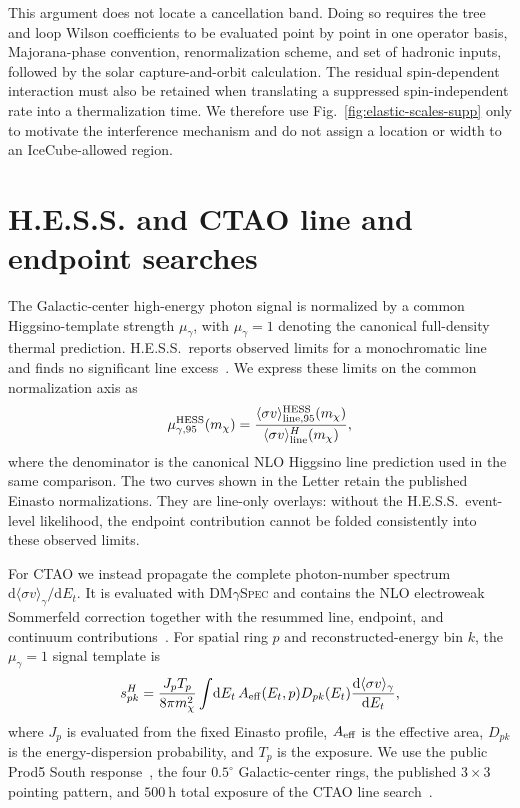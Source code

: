 \documentclass[%
  aps,
  prl,
  reprint,
  superscriptaddress,
  amsmath,
  amssymb,
  longbibliography
]{revtex4-2}
\begin{document}
{This argument does not locate a cancellation band.  Doing so requires the
tree and loop Wilson coefficients to be evaluated point by point in one
operator basis, Majorana-phase convention, renormalization scheme, and set
of hadronic inputs,
followed by the solar capture-and-orbit calculation.  The residual
spin-dependent interaction must also be retained when translating a
suppressed spin-independent rate into a thermalization time.  We therefore
use Fig.~\ref{fig:elastic-scales-supp} only to motivate the interference
mechanism and do not assign a location or width to an IceCube-allowed
region.


\section{H.E.S.S. and CTAO line and endpoint searches}
\label{sec:hess-ctao-supp}

The Galactic-center high-energy photon signal is normalized by a common
Higgsino-template strength \(\mu_\gamma\), with \(\mu_\gamma=1\) denoting
the canonical full-density thermal prediction.  H.E.S.S.~reports observed
limits for a monochromatic line and finds no significant line
excess~\cite{HESS:2026ila}.  We express these limits on the common
normalization axis as
\begin{equation}
 \mu_{\gamma,95}^{\rm HESS}(m_\chi)=
 \frac{\langle\sigma v\rangle_{\rm line,95}^{\rm HESS}(m_\chi)}
 {\langle\sigma v\rangle_{\rm line}^{H}(m_\chi)},
 \label{eq:hess-normalization-supp}
\end{equation}
where the denominator is the canonical NLO Higgsino line prediction used in
the same comparison.  The two curves shown in the Letter retain the
published Einasto normalizations.  They are line-only overlays: without the
H.E.S.S.~event-level likelihood, the endpoint contribution cannot be folded
consistently into these observed limits.

For CTAO we instead propagate the complete photon-number spectrum
\(\mathrm{d}\langle\sigma v\rangle_\gamma/\mathrm{d}E_t\).  It is
evaluated with \textsc{DM$\gamma$Spec} and contains the NLO electroweak
Sommerfeld correction together with the resummed line, endpoint, and
continuum contributions~\cite{Beneke:2019gtg,Urban:2021cdu,
Beneke:2022eci}.  For spatial ring \(p\) and reconstructed-energy bin \(k\),
the \(\mu_\gamma=1\) signal template is
\begin{equation}
 s_{pk}^{H}=
 \frac{J_pT_p}{8\pi m_\chi^2}
 \int\!\mathrm{d}E_t\,
 A_{\rm eff}(E_t,p)D_{pk}(E_t)
 \frac{\mathrm{d}\langle\sigma v\rangle_\gamma}{\mathrm{d}E_t},
 \label{eq:ctao-signal-supp}
\end{equation}
where \(J_p\) is evaluated from the fixed Einasto profile,
\(A_{\rm eff}\) is the effective area, \(D_{pk}\) is the energy-dispersion
probability, and \(T_p\) is the exposure.  We use the public Prod5 South
response~\cite{cherenkov_telescope_array_observatory_2021_5499840}, the four
\(0.5^\circ\) Galactic-center rings, the published \(3\times3\) pointing
pattern, and \(500~\mathrm{h}\) total exposure of the CTAO line
search~\cite{CTAO:2024wvb}.

}
\end{document}
